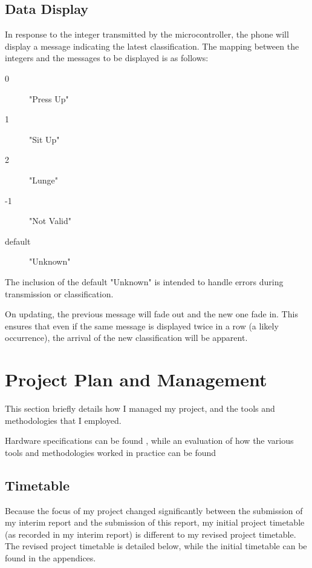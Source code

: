 \documentclass[a4paper]{article}
\begin{document}
\subsection{Data Display}%

In response to the integer transmitted by the microcontroller, the phone will display a message indicating the latest classification. The mapping between the integers and the messages to be displayed is as follows:
\begin{description}
\item[0] "Press Up"
\item[1] "Sit Up"
\item[2] "Lunge"
\item[-1] "Not Valid"
\item[default] "Unknown"
\end{description}

The inclusion of the default "Unknown" is intended to handle errors during transmission or classification.

On updating, the previous message will fade out and the new one fade in. This ensures that even if the same message is displayed twice in a row (a likely occurrence), the arrival of the new classification will be apparent.

\newpage
\section{Project Plan and Management}

This section briefly details how I managed my project, and the tools and methodologies that I employed. 

Hardware specifications can be found , while an evaluation of how the various tools and methodologies worked in practice can be found 

\subsection{Timetable}%

Because the focus of my project changed significantly between the submission of my interim report and the submission of this report, my initial project timetable (as recorded in my interim report) is different to my revised project timetable. The revised project timetable is detailed below, while the initial timetable can be found in the appendices.
\end{document}
